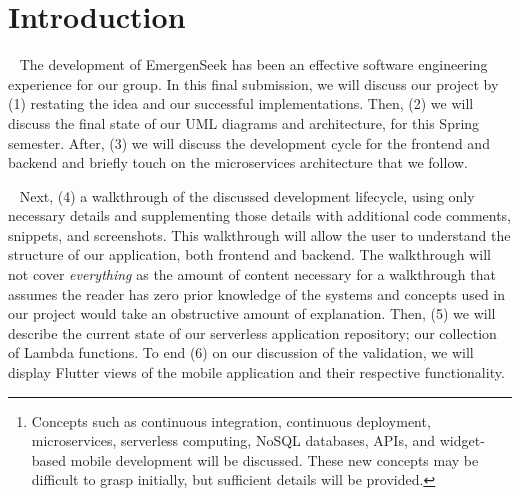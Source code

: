 \documentclass[10pt, a4paper]{article}
\begin{document}
\vspace*{\fill}
\vspace{-2cm}
\begin{abstract}
In this final report, we describe and detail the validation of EmergenSeek, a multiuse, cross-platform mobile application providing simple access to emergency services and contact connections. As with previous reports, we will structure the report by enumerating on the frontend and backend. Dissimilarly, we will only describe necessary details in the validation of our implementations, to the extent that, any other developer with some programming background will be able to successfully implement our system's components. Only necessary details will be presented to the reader and care should be taken when reading them\footnote{Concepts such as continuous integration, continuous deployment, microservices, serverless computing, NoSQL databases, APIs, and widget-based mobile development will be discussed. These new concepts may be difficult to grasp initially, but sufficient details will be provided.}. Restatements from previous deliverable reports will be made to remind the reader of pre-defined, but important information. Also, a glossary is provided at the end of the report to define terms and jargon that may be confusing or unfamiliar for the reader. \\
\textit{Keywords:} API Gateway, CI/CD, Cloud, Dart, Flutter, Golang, Lambda, Mobile, Serverless
\end{abstract}
\vspace*{\fill}
\newpage

\tableofcontents
\newpage


\section{Introduction}
\par ~ The development of EmergenSeek has been an effective software engineering experience for our group. In this final submission, we will discuss our project by (1) restating the idea and our successful implementations. Then, (2) we will discuss the final state of our UML diagrams and architecture, for this Spring semester. After, (3) we will discuss the development cycle for the frontend and backend and briefly touch on the microservices architecture that we follow. 

\par ~ Next, (4) a walkthrough of the discussed development lifecycle, using only necessary details and supplementing those details with additional code comments, snippets, and screenshots. This walkthrough will allow the user to understand the structure of our application, both frontend and backend. The walkthrough will not cover \emph{everything} as the amount of content necessary for a walkthrough that assumes the reader has zero prior knowledge of the systems and concepts used in our project would take an obstructive amount of explanation. Then, (5) we will describe the current state of our serverless application repository; our collection of Lambda functions. To end (6) on our discussion of the validation, we will display Flutter views of the mobile application and their respective functionality. 
\end{document}
